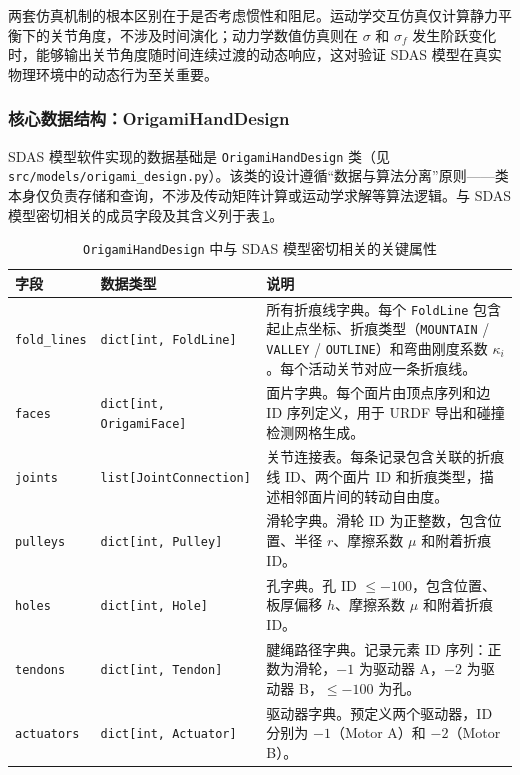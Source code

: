 \documentclass[12pt,a4paper]{report}
\begin{document}
两套仿真机制的根本区别在于是否考虑惯性和阻尼。运动学交互仿真仅计算静力平衡下的关节角度，不涉及时间演化；动力学数值仿真则在 $\sigma$ 和 $\sigma_f$ 发生阶跃变化时，能够输出关节角度随时间连续过渡的动态响应，这对验证 SDAS 模型在真实物理环境中的动态行为至关重要。


\subsubsection{核心数据结构：OrigamiHandDesign}
\label{sec:data_structures}

SDAS 模型软件实现的数据基础是 \lstinline{OrigamiHandDesign} 类（见 \lstinline{src/models/origami_design.py}）。该类的设计遵循``数据与算法分离''原则——类本身仅负责存储和查询，不涉及传动矩阵计算或运动学求解等算法逻辑。与 SDAS 模型密切相关的成员字段及其含义列于表\,\ref{tab:design_fields}。

\begin{table}[htbp]
\centering
\caption{\lstinline{OrigamiHandDesign} 中与 SDAS 模型密切相关的关键属性}
\label{tab:design_fields}
\small
\begin{tabular}{@{}p{2.5cm}p{2.5cm}p{8.5cm}@{}}
\toprule
\textbf{字段} & \textbf{数据类型} & \textbf{说明} \\
\midrule
\lstinline{fold_lines} & \lstinline{dict[int, FoldLine]} & 所有折痕线字典。每个 \lstinline{FoldLine} 包含起止点坐标、折痕类型（\lstinline{MOUNTAIN} / \lstinline{VALLEY} / \lstinline{OUTLINE}）和弯曲刚度系数 $\kappa_i$。每个活动关节对应一条折痕线。\\
\lstinline{faces} & \lstinline{dict[int, OrigamiFace]} & 面片字典。每个面片由顶点序列和边 ID 序列定义，用于 URDF 导出和碰撞检测网格生成。\\
\lstinline{joints} & \lstinline{list[JointConnection]} & 关节连接表。每条记录包含关联的折痕线 ID、两个面片 ID 和折痕类型，描述相邻面片间的转动自由度。\\
\lstinline{pulleys} & \lstinline{dict[int, Pulley]} & 滑轮字典。滑轮 ID 为正整数，包含位置、半径 $r$、摩擦系数 $\mu$ 和附着折痕 ID。\\
\lstinline{holes} & \lstinline{dict[int, Hole]} & 孔字典。孔 ID $\le -100$，包含位置、板厚偏移 $h$、摩擦系数 $\mu$ 和附着折痕 ID。\\
\lstinline{tendons} & \lstinline{dict[int, Tendon]} & 腱绳路径字典。记录元素 ID 序列：正数为滑轮，$-1$ 为驱动器 A，$-2$ 为驱动器 B，$\le -100$ 为孔。\\
\lstinline{actuators} & \lstinline{dict[int, Actuator]} & 驱动器字典。预定义两个驱动器，ID 分别为 $-1$（Motor A）和 $-2$（Motor B）。\\
\bottomrule
\end{tabular}
\end{table}
\end{document}
